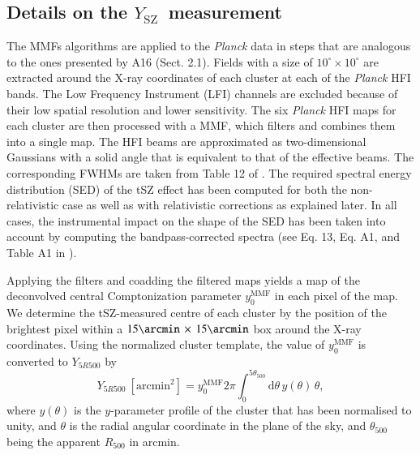 \documentclass{aa}   %
\newcommand{\Ysz}{$Y_{\text{SZ}}$}
\begin{document}
\subsection{Details on the \Ysz\ measurement}\label{details_ysz}

The MMFs algorithms are applied to the \textit{Planck} data in steps that are analogous to the ones presented by A16 (Sect. 2.1). Fields with a size of $10^{\circ} \times 10^{\circ}$ are extracted around the X-ray coordinates of each cluster at each of the \textit{Planck} HFI bands. The Low Frequency Instrument (LFI) channels are excluded because of their low spatial resolution and lower sensitivity. The six \textit{Planck} HFI maps for each cluster are then processed with a MMF, which filters and combines them into a single map. The HFI beams are approximated as two-dimensional Gaussians with a solid angle that is equivalent to that of the effective beams. The corresponding FWHMs are taken from Table 12 of \citet[][]{Planck_HFI}. The required spectral energy distribution (SED) of the tSZ effect has been computed for both the non-relativistic case as well as with relativistic corrections \citep[computed with SZpack;][]{Chluba12} as explained later. In all cases, the instrumental impact on the shape of the SED has been taken into account by computing the bandpass-corrected spectra (see Eq. 13, Eq. A1, and Table A1 in \citealt{erler18}).  

Applying the filters and coadding the filtered maps yields a map of the deconvolved central Comptonization parameter $y_0^{\text{MMF}}$ in each pixel of the map. We determine the tSZ-measured centre of each cluster by the position of the brightest pixel within a $15\arcmin \, \times \, 15\arcmin$ box around the X-ray coordinates. Using the normalized cluster template, the value of $y_0^{\text{MMF}}$ is converted to $Y_{5R500}$ by
\begin{equation}
	Y_{5R500} \ \left[\mathrm{arcmin}^2\right] = y_0^\mathrm{MMF} 2 \pi \int_0^{5\theta_{500}} \mathrm{d}\theta \, y(\theta) \, \theta,
\end{equation}
where $y(\theta)$ is the $y$-parameter profile of the cluster that has been normalised to unity, and $\theta$ is the radial angular coordinate in the plane of the sky, and $\theta _{500}$ being the apparent $R_{500}$ in arcmin.
\end{document}
